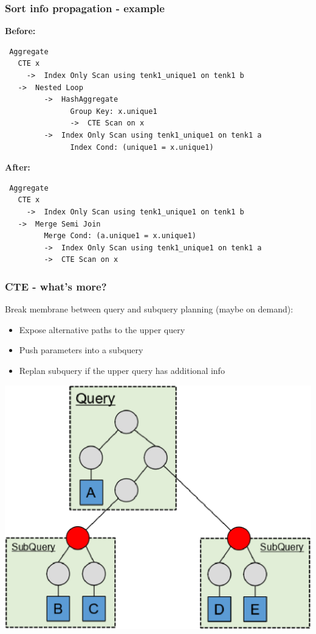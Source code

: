 \documentclass{beamer}
\begin{document}
\begin{frame}[fragile]\frametitle{Sort info propagation - example}
\textbf{Before:}
\begin{lstlisting}
 Aggregate
   CTE x
     ->  Index Only Scan using tenk1_unique1 on tenk1 b
   ->  Nested Loop
         ->  HashAggregate
               Group Key: x.unique1
               ->  CTE Scan on x
         ->  Index Only Scan using tenk1_unique1 on tenk1 a
               Index Cond: (unique1 = x.unique1)
\end{lstlisting}
\textbf{After:}
\begin{lstlisting}
 Aggregate
   CTE x
     ->  Index Only Scan using tenk1_unique1 on tenk1 b
   ->  Merge Semi Join
         Merge Cond: (a.unique1 = x.unique1)
         ->  Index Only Scan using tenk1_unique1 on tenk1 a
         ->  CTE Scan on x
\end{lstlisting}
\end{frame}

\begin{frame}\frametitle{CTE - what's more?}
Break membrane between query and subquery planning (maybe on demand):
\begin{itemize}
  \item Expose alternative paths to the upper query
  \item Push parameters into a subquery
  \item Replan subquery if the upper query has additional info
\end{itemize}
\hspace*{\fill}
	\includegraphics[scale=0.2]{pics/subplan_membrane}
\end{frame}
\end{document}
